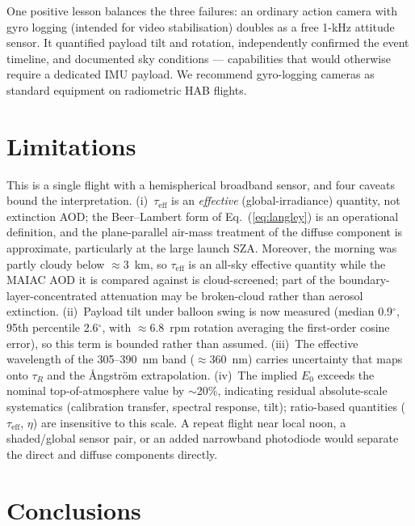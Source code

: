 \documentclass[11pt,a4paper]{article}
\begin{document}
One positive lesson balances the three failures: an ordinary action camera with gyro
logging (intended for video stabilisation) doubles as a free 1-kHz attitude sensor. It
quantified payload tilt and rotation, independently confirmed the event timeline, and
documented sky conditions --- capabilities that would otherwise require a dedicated IMU
payload. We recommend gyro-logging cameras as standard equipment on radiometric HAB
flights.

\section{Limitations}
\label{sec:limits}

This is a single flight with a hemispherical broadband sensor, and four caveats bound the
interpretation. (i)~$\tau_{\mathrm{eff}}$ is an \emph{effective} (global-irradiance)
quantity, not extinction AOD; the Beer--Lambert form of Eq.~(\ref{eq:langley}) is an
operational definition, and the plane-parallel air-mass treatment of the diffuse component
is approximate, particularly at the large launch SZA. Moreover, the morning was partly
cloudy below $\approx$3~km, so $\tau_{\mathrm{eff}}$ is an all-sky effective quantity
while the MAIAC AOD it is compared against is cloud-screened; part of the
boundary-layer-concentrated attenuation may be broken-cloud rather than aerosol
extinction. (ii)~Payload tilt under balloon swing is now measured (median 0.9$^\circ$,
95th percentile 2.6$^\circ$, with $\approx$6.8~rpm rotation averaging the first-order
cosine error), so this term is bounded rather than assumed. (iii)~The effective wavelength
of the 305--390~nm band ($\approx$360~nm) carries uncertainty that maps onto $\tau_R$ and
the \r{A}ngstr\"om extrapolation. (iv)~The implied $E_0$ exceeds the nominal
top-of-atmosphere value by $\sim$20\%, indicating residual absolute-scale systematics
(calibration transfer, spectral response, tilt); ratio-based quantities
($\tau_{\mathrm{eff}}$, $\eta$) are insensitive to this scale. A repeat flight near local
noon, a shaded/global sensor pair, or an added narrowband photodiode would separate the
direct and diffuse components directly.

\section{Conclusions}
\end{document}
